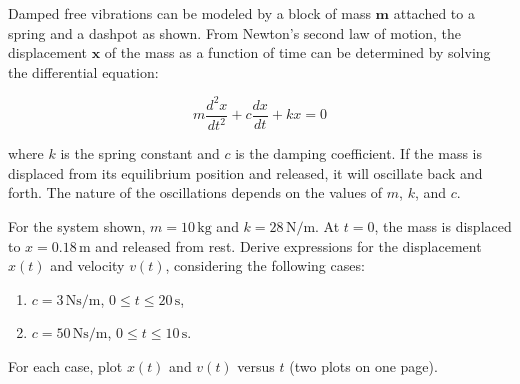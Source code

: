 \documentclass[a4paper, 12pt]{report}
\def\ni{green!60!black!40!white}
\def\link{blue!50!black}
\begin{document}
\newpage

\begin{tcolorbox}[title={\color{black}\section{Q3}}, colback=white, colframe=\ni, boxrule=1mm, width=1\textwidth]
    Damped free vibrations can be modeled by a block of mass \(\mathbf{m}\) attached to a spring and a dashpot as shown. From Newton's second law of motion, the displacement \(\mathbf{x}\) of the mass as a function of time can be determined by solving the differential equation:
    
    \[
    m \frac{d^2x}{dt^2} + c \frac{dx}{dt} + kx = 0
    \]
    
    where \(k\) is the spring constant and \(c\) is the damping coefficient. If the mass is displaced from its equilibrium position and released, it will oscillate back and forth. The nature of the oscillations depends on the values of \(m\), \(k\), and \(c\).
    
    For the system shown, \(m = 10 \, \text{kg}\) and \(k = 28 \, \text{N/m}\). At \(t = 0\), the mass is displaced to \(x = 0.18 \, \text{m}\) and released from rest. Derive expressions for the displacement \(x(t)\) and velocity \(v(t)\), considering the following cases:
    
    \begin{enumerate}
        \item \(c = 3 \, \text{Ns/m}\), \(0 \leq t \leq 20 \, \text{s}\),
        \item \(c = 50 \, \text{Ns/m}\), \(0 \leq t \leq 10 \, \text{s}\).
    \end{enumerate}
    
    For each case, plot \(x(t)\) and \(v(t)\) versus \(t\) (two plots on one page).
\end{tcolorbox}



\newpage
\end{document}
